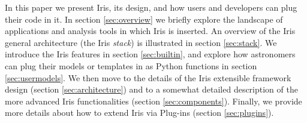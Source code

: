 In this paper we present Iris, its design, and how users and developers can plug their code in it. In section \ref{sec:overview} we briefly explore the landscape of applications and analysis tools in which Iris is inserted. An overview of the Iris general architecture (the Iris \emph{stack}) is illustrated in section \ref{sec:stack}. We introduce the Iris features in section \ref{sec:builtin}, and explore how astronomers can plug their models or templates in as Python functions in section \ref{sec:usermodels}. We then move to the details of the Iris extensible framework design (section \ref{sec:architecture}) and to a somewhat detailed description of the more advanced Iris functionalities (section \ref{sec:components}). Finally, we provide more details about how to extend Iris via Plug-ins (section \ref{sec:plugins}).